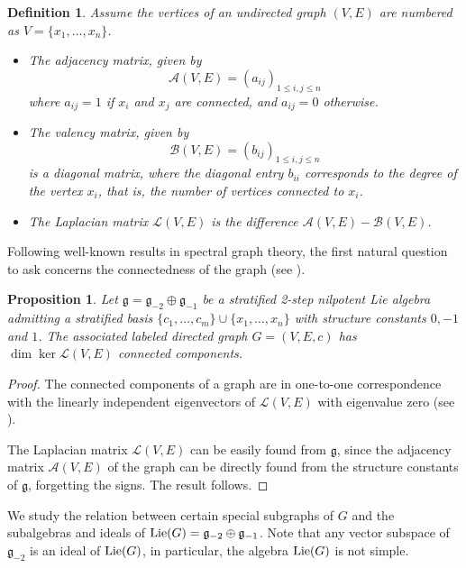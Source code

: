 \documentclass[12pt]{amsart}
\newtheorem{defn}[teo]{Definition}
\newtheorem{proposition}[teo]{Proposition}
\begin{document}
\begin{defn} 
Assume the vertices of an undirected graph $(V,E)$ are numbered as $V=\{x_1,\hdots, x_n\}$.
\begin{itemize}
\item The {\em adjacency matrix}, given by $$\mathcal{A}(V,E)=(a_{ij})_{1\leq i,j\leq n}$$ where  $a_{ij}=1$ if $x_i$ and $x_j$ are connected, and $a_{ij}=0$ otherwise. 
\item The {\em valency matrix}, given by $$\mathcal{B}(V,E)=(b_{ij})_{1\leq i,j\leq n}$$ is a diagonal matrix, where the diagonal entry $b_{ii}$ corresponds to the degree of the vertex $x_i$, that is, the number of vertices connected to $x_i$.
\item The {\em Laplacian matrix} $\mathcal{L}(V,E)$ is the difference $\mathcal{A}(V,E)-\mathcal{B}(V,E)$.
\end{itemize}
\end{defn}

Following well-known results in spectral graph theory, the first natural question to ask concerns the connectedness of the graph (see \cite{chung}).

\begin{proposition}
Let ${\mathfrak g}={\mathfrak g}_{-2}\oplus{\mathfrak g}_{-1}$ be a stratified 2-step nilpotent Lie algebra admitting a stratified basis $\{c_1,\dotsc,c_m\}\cup\{x_1,\dotsc,x_n\}$ with structure constants $0,-1$ and $1$. The associated labeled directed graph $G=(V,E,c)$ has $\dim\ker\mathcal{L}(V,E)$ connected components.
\end{proposition}

\begin{proof}
The connected components of a graph are in one-to-one correspondence with the linearly independent eigenvectors of $\mathcal{L}(V,E)$ with eigenvalue zero (see \cite{nica}). 

The Laplacian matrix $\mathcal{L}(V,E)$ can be easily found from ${\mathfrak g}$, since the adjacency matrix $\mathcal{A}(V,E)$ of the graph can be directly found from the structure constants of ${\mathfrak g}$, forgetting the signs. The result follows.
\end{proof}

We study the relation between certain special subgraphs of $G$ and the subalgebras and ideals of ${\rm Lie}(G)=\mathfrak{g}_{-2}\oplus\mathfrak{g}_{-1}$. Note that any vector subspace of $\mathfrak{g}_{-2}$ is an ideal of ${\rm Lie}(G)$, in particular, the algebra ${\rm Lie}(G)$ is not simple. 
\end{document}
